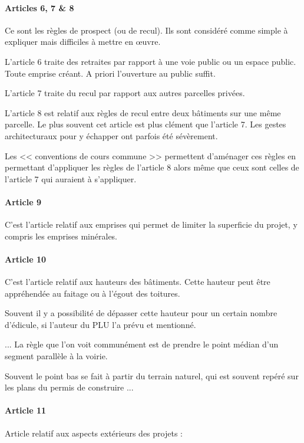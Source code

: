 			\paragraph{Articles 6, 7 \& 8} Ce sont les règles de prospect (ou de recul). Ils sont considéré comme simple à expliquer mais difficiles à mettre en œuvre.

			L'article 6 traite des retraites par rapport à une voie public ou un espace public. Toute emprise créant. A priori l'ouverture au public suffit.

			L'article 7 traite du recul par rapport aux autres parcelles privées.

			L'article 8 est relatif aux règles de recul entre deux bâtiments sur une même parcelle. Le plus souvent cet article est plus clément que l'article 7. Les gestes architecturaux pour y échapper ont parfois été sévèrement.

			Les << conventions de cours commune >> permettent d'aménager ces règles en permettant d'appliquer les règles de l'article 8 alors même que ceux sont celles de l'article 7 qui auraient à s'appliquer.

			\paragraph{Article 9} C'est l'article relatif aux emprises qui permet de limiter la superficie du projet, y compris les emprises minérales.

			\paragraph{Article 10} C'est l'article relatif aux hauteurs des bâtiments. Cette hauteur peut être appréhendée au faitage ou à l'égout des toitures.

			Souvent il y a possibilité de dépasser cette hauteur pour un certain nombre d'édicule, si l'auteur du PLU l'a prévu et mentionné.

			...
			La règle que l'on voit communément est de prendre le point médian d'un segment parallèle à la voirie.

			Souvent le point bas se fait à partir du terrain naturel, qui est souvent repéré sur les plans du permis de construire ...

			\paragraph{Article 11} Article relatif aux aspects extérieurs des projets :

